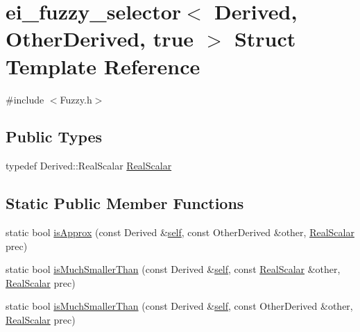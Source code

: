 \hypertarget{structei__fuzzy__selector_3_01_derived_00_01_other_derived_00_01true_01_4}{\section{ei\-\_\-fuzzy\-\_\-selector$<$ Derived, Other\-Derived, true $>$ Struct Template Reference}
\label{structei__fuzzy__selector_3_01_derived_00_01_other_derived_00_01true_01_4}
}


{\ttfamily \#include $<$Fuzzy.\-h$>$}

\subsection*{Public Types}
\begin{DoxyCompactItemize}
\item 
typedef Derived\-::\-Real\-Scalar \hyperlink{structei__fuzzy__selector_3_01_derived_00_01_other_derived_00_01true_01_4_afae0956bf57e87a08138b34642aafa82}{Real\-Scalar}
\end{DoxyCompactItemize}
\subsection*{Static Public Member Functions}
\begin{DoxyCompactItemize}
\item 
static bool \hyperlink{structei__fuzzy__selector_3_01_derived_00_01_other_derived_00_01true_01_4_acdd90a32aeead33195d360654fc804f0}{is\-Approx} (const Derived \&\hyperlink{qxtdiscoverableservice_8cpp_a11956026531aa7552f541d9ddc69403d}{self}, const Other\-Derived \&other, \hyperlink{structei__fuzzy__selector_3_01_derived_00_01_other_derived_00_01true_01_4_afae0956bf57e87a08138b34642aafa82}{Real\-Scalar} prec)
\item 
static bool \hyperlink{structei__fuzzy__selector_3_01_derived_00_01_other_derived_00_01true_01_4_a6fe7e46128eb4ab9e8666576d5bd73ea}{is\-Much\-Smaller\-Than} (const Derived \&\hyperlink{qxtdiscoverableservice_8cpp_a11956026531aa7552f541d9ddc69403d}{self}, const \hyperlink{structei__fuzzy__selector_3_01_derived_00_01_other_derived_00_01true_01_4_afae0956bf57e87a08138b34642aafa82}{Real\-Scalar} \&other, \hyperlink{structei__fuzzy__selector_3_01_derived_00_01_other_derived_00_01true_01_4_afae0956bf57e87a08138b34642aafa82}{Real\-Scalar} prec)
\item 
static bool \hyperlink{structei__fuzzy__selector_3_01_derived_00_01_other_derived_00_01true_01_4_aa0e0ad1f2496fe50d016ec31c026b4fd}{is\-Much\-Smaller\-Than} (const Derived \&\hyperlink{qxtdiscoverableservice_8cpp_a11956026531aa7552f541d9ddc69403d}{self}, const Other\-Derived \&other, \hyperlink{structei__fuzzy__selector_3_01_derived_00_01_other_derived_00_01true_01_4_afae0956bf57e87a08138b34642aafa82}{Real\-Scalar} prec)
\end{DoxyCompactItemize}


